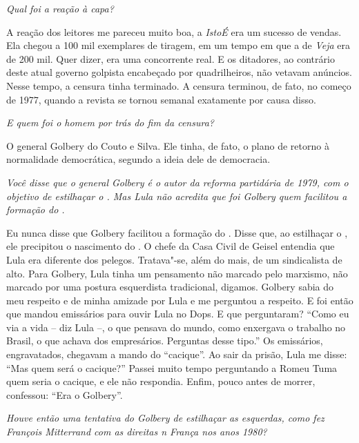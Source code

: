 \itshape
 Qual foi a reação à capa?

\normalfont 
A reação dos leitores me pareceu muito boa, a
\emph{IstoÉ} era um sucesso de vendas. Ela chegou a 100 mil exemplares
de tiragem, em um tempo em que a de \emph{Veja} era de 200 mil. Quer
dizer, era uma concorrente real. E os ditadores, ao contrário deste
atual governo golpista encabeçado por quadrilheiros, não vetavam
anúncios. Nesse tempo, a censura tinha terminado. A censura terminou, de
fato, no começo de 1977, quando a revista se tornou semanal exatamente
por causa disso.

\itshape
 E quem foi o homem por trás do fim da censura?

\normalfont 
O general Golbery do Couto e Silva. Ele tinha, de fato, o
plano de retorno à normalidade democrática, segundo a ideia dele de
democracia.

\itshape
 Você disse que o general Golbery é o autor da reforma
partidária de 1979, com o objetivo de estilhaçar o . Mas Lula não
acredita que foi Golbery quem facilitou a formação do .

\normalfont 
Eu nunca disse que Golbery facilitou a formação do .
Disse que, ao estilhaçar o , ele precipitou o nascimento do . O
chefe da Casa Civil de Geisel entendia que Lula era diferente dos
pelegos. Tratava"-se, além do mais, de um sindicalista de  alto. Para
Golbery, Lula tinha um pensamento não marcado pelo marxismo, não marcado
por uma postura esquerdista tradicional, digamos. Golbery sabia do meu
respeito e de minha amizade por Lula e me perguntou a respeito. E foi
então que mandou emissários para ouvir Lula no Dops. E que perguntaram?
``Como eu via a vida -- diz Lula --, o que pensava do mundo, como
enxergava o trabalho no Brasil, o que achava dos empresários. Perguntas
desse tipo.'' Os emissários, engravatados, chegavam a mando do
``cacique''. Ao sair da prisão, Lula me disse: ``Mas quem será o
cacique?'' Passei muito tempo perguntando a Romeu Tuma quem seria o
cacique, e ele não respondia. Enfim, pouco antes de morrer, confessou:
``Era o Golbery''.

\itshape
 Houve então uma tentativa do Golbery de estilhaçar as
esquerdas, como fez François Mitterrand com as direitas n França nos
anos 1980?

